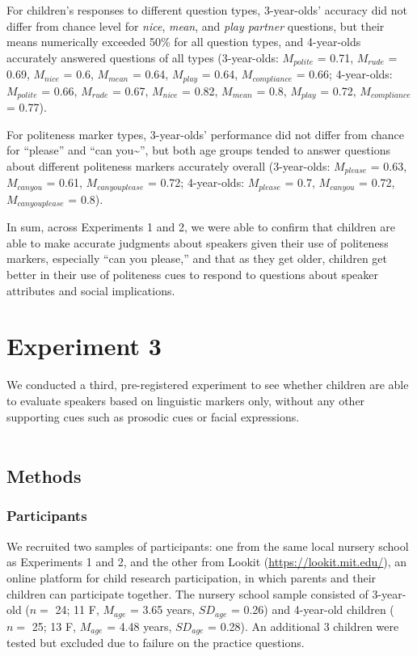 \documentclass[10pt, letterpaper]{article}
\begin{document}
For children's responses to different question types, 3-year-olds'
accuracy did not differ from chance level for \emph{nice}, \emph{mean},
and \emph{play partner} questions, but their means numerically exceeded
50\% for all question types, and 4-year-olds accurately answered
questions of all types (3-year-olds: \(M_{polite}\) = 0.71, \(M_{rude}\)
= 0.69, \(M_{nice}\) = 0.6, \(M_{mean}\) = 0.64, \(M_{play}\) = 0.64,
\(M_{compliance}\) = 0.66; 4-year-olds: \(M_{polite}\) = 0.66,
\(M_{rude}\) = 0.67, \(M_{nice}\) = 0.82, \(M_{mean}\) = 0.8,
\(M_{play}\) = 0.72, \(M_{compliance}\) = 0.77).

For politeness marker types, 3-year-olds' performance did not differ
from chance for ``please'' and ``can you\textasciitilde{}'', but both
age groups tended to answer questions about different politeness markers
accurately overall (3-year-olds: \(M_{please}\) = 0.63, \(M_{can you}\)
= 0.61, \(M_{can you please}\) = 0.72; 4-year-olds: \(M_{please}\) =
0.7, \(M_{can you}\) = 0.72, \(M_{can you please}\) = 0.8).

In sum, across Experiments 1 and 2, we were able to confirm that
children are able to make accurate judgments about speakers given their
use of politeness markers, especially ``can you please,'' and that as
they get older, children get better in their use of politeness cues to
respond to questions about speaker attributes and social implications.

\section{Experiment 3}\label{experiment-3}

We conducted a third, pre-registered experiment to see whether children
are able to evaluate speakers based on linguistic markers only, without
any other supporting cues such as prosodic cues or facial expressions.\\
\hspace*{0.333em} ~

\subsection{Methods}\label{methods-2}

\subsubsection{Participants}\label{participants-2}

We recruited two samples of participants: one from the same local
nursery school as Experiments 1 and 2, and the other from Lookit
(\url{https://lookit.mit.edu/}), an online platform for child research
participation, in which parents and their children can participate
together. The nursery school sample consisted of 3-year-old (\(n=\) 24;
11 F, \(M_{age}\) = 3.65 years, \(SD_{age}\) = 0.26) and 4-year-old
children (\(n=\) 25; 13 F, \(M_{age}\) = 4.48 years, \(SD_{age}\) =
0.28). An additional 3 children were tested but excluded due to failure
on the practice questions.
\end{document}
